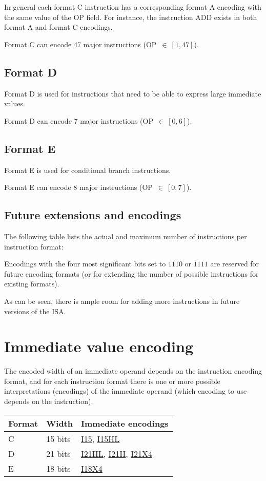 In general each format C instruction has a corresponding format A encoding with
the same value of the OP field. For instance, the instruction ADD exists in
both format A and format C encodings.

Format C can encode 47 major instructions (OP~$\in~[1,47]$).

\subsection{Format D}

Format D is used for instructions that need to be able to express large
immediate values.

Format D can encode 7 major instructions (OP~$\in~[0,6]$).

\subsection{Format E}

Format E is used for conditional branch instructions.

Format E can encode 8 major instructions (OP~$\in~[0,7]$).

\subsection{Future extensions and encodings}

The following table lists the actual and maximum number of instructions per
instruction format:



Encodings with the four most significant bits set to $1110$ or $1111$ are
reserved for future encoding formats (or for extending the number of possible
instructions for existing formats).

As can be seen, there is ample room for adding more instructions in future
versions of the ISA.

\section{Immediate value encoding}

The encoded width of an immediate operand depends on the instruction encoding
format, and for each instruction format there is one or more possible
interpretations (encodings) of the immediate operand (which encoding to use
depends on the instruction).

\begin{tabular}{|l|l|p{130pt}|}
  \hline
  \textbf{Format} & \textbf{Width} & \textbf{Immediate encodings} \\
  \hline
  C & 15 bits & \hyperref[imm:I15]{I15}, \hyperref[imm:I15HL]{I15HL} \\
  \hline
  D & 21 bits & \hyperref[imm:I21HL]{I21HL}, \hyperref[imm:I21H]{I21H}, \hyperref[imm:I21X4]{I21X4} \\
  \hline
  E & 18 bits & \hyperref[imm:I18X4]{I18X4} \\
  \hline
\end{tabular}

